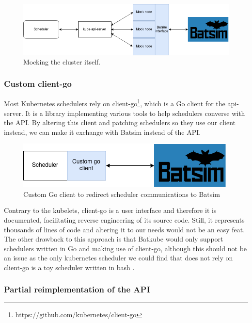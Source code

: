\begin{figure}[h]
	\centering
	\includegraphics[width=\textwidth]{imgs/architecture-as-kubelets.png}
	\caption{Mocking the cluster itself.}
	\label{fig:mock_nodes}
\end{figure}

\subsubsection{Custom client-go}

Most Kubernetes schedulers rely on
client-go\footnote{https://github.com/kubernetes/client-go}, which is a Go
client for the api-server. It is a library implementing various tools to help
schedulers converse with the API. By altering this client and patching
schedulers so they use our client instead, we can make it exchange with Batsim
instead of the API. 

\begin{figure}[h]
	\centering
	\includegraphics[scale=0.8]{imgs/custom-go-client.png}
	\caption{Custom Go client to redirect scheduler communications to Batsim}
	\label{fig:custom-go-client}
\end{figure}

Contrary to the kubelets, client-go is a user interface and therefore it is
documented, facilitating reverse engineering of its source code. Still, it
represents thousands of lines of code and altering it to our needs would not be
an easy feat.  The other drawback to this approach is that Batkube would only
support schedulers written in Go and making use of client-go, although this
should not be an issue as the only kubernetes scheduler we could find that does
not rely on client-go is a toy scheduler written in bash \cite{bash-scheduler}.

\subsubsection{Partial reimplementation of the API}

